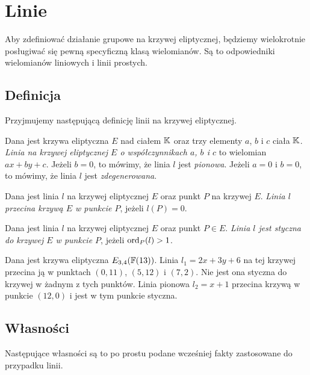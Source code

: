 \section{Linie}

\noindent
Aby zdefiniować działanie grupowe na krzywej eliptycznej,
będziemy wielokrotnie posługiwać się
pewną specyficzną klasą wielomianów.
Są to odpowiedniki wielomianów liniowych
i linii prostych.

\subsection*{Definicja}

\noindent
Przyjmujemy następującą definicję linii na krzywej eliptycznej.

\begin{definition}
Dana jest krzywa eliptyczna $E$ nad ciałem $\mathbb{K}$
oraz trzy elementy $a$, $b$ i $c$ ciała $\mathbb{K}$.
\emph{Linia na krzywej eliptycznej $E$ o współczynnikach $a$, $b$ i $c$}
to wielomian $ax + by + c$.
Jeżeli $b = 0$, to mówimy, że linia $l$ jest \emph{pionowa}.
Jeżeli $a = 0$ i $b = 0$, to mówimy, że linia $l$ jest \emph{zdegenerowana}.
\end{definition}

\begin{definition}
Dana jest linia $l$ na krzywej eliptycznej $E$
oraz punkt $P$ na krzywej $E$.
\emph{Linia $l$ przecina krzywą $E$ w punkcie $P$},
jeżeli $l(P) = 0$.
\end{definition}

\begin{definition}
Dana jest linia $l$ na krzywej eliptycznej $E$
oraz punkt $P \in E$.
\emph{Linia $l$ jest styczna do krzywej $E$ w punkcie $P$},
jeżeli $\operatorname{ord}_P(l) > 1$.
\end{definition}

\begin{example}
Dana jest krzywa eliptyczna $E_{3, 4}(\mathbb{F}(13))$.
Linia $l_1 = 2x + 3y + 6$ na tej krzywej
przecina ją w punktach $(0, 11)$, $(5, 12)$ i $(7, 2)$.
Nie jest ona styczna do krzywej w żadnym z tych punktów.
Linia pionowa $l_2 = x + 1$
przecina krzywą w punkcie $(12, 0)$
i jest w tym punkcie styczna.
\end{example}

\subsection*{Własności}

\noindent
Następujące własności są to po prostu podane wcześniej fakty
zastosowane do przypadku linii.

